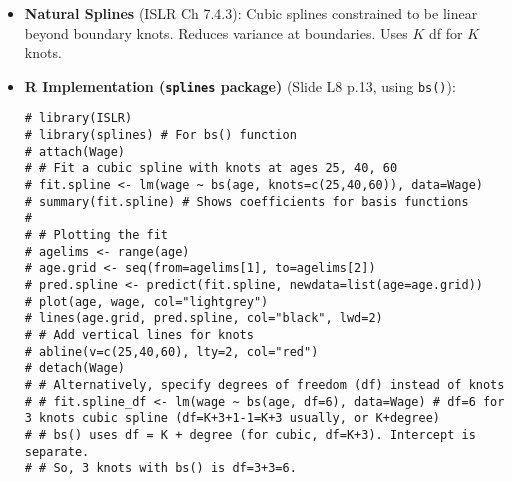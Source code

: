 \documentclass[12pt,a4paper]{article}
\newcommand{\Rpackage}[1]{\texttt{#1}} %
\newcommand{\Rfunction}[1]{\texttt{#1()}} %
\begin{document}
\begin{itemize}
\begin{itemize}
\begin{itemize}
                \end{itemize}
            \item \textbf{Natural Splines} (ISLR Ch 7.4.3): Cubic splines constrained to be linear beyond boundary knots. Reduces variance at boundaries. Uses $K$ df for $K$ knots.
            \item \textbf{R Implementation (\Rpackage{splines} package)} (Slide L8 p.13, using \Rfunction{bs}):
\begin{lstlisting}[caption={Regression Spline with Wage Data (Slide L8 p.13)}]
# library(ISLR)
# library(splines) # For bs() function
# attach(Wage)
# # Fit a cubic spline with knots at ages 25, 40, 60
# fit.spline <- lm(wage ~ bs(age, knots=c(25,40,60)), data=Wage)
# summary(fit.spline) # Shows coefficients for basis functions
# 
# # Plotting the fit
# agelims <- range(age)
# age.grid <- seq(from=agelims[1], to=agelims[2])
# pred.spline <- predict(fit.spline, newdata=list(age=age.grid))
# plot(age, wage, col="lightgrey")
# lines(age.grid, pred.spline, col="black", lwd=2)
# # Add vertical lines for knots
# abline(v=c(25,40,60), lty=2, col="red")
# detach(Wage)
# # Alternatively, specify degrees of freedom (df) instead of knots
# # fit.spline_df <- lm(wage ~ bs(age, df=6), data=Wage) # df=6 for 3 knots cubic spline (df=K+3+1-1=K+3 usually, or K+degree)
# # bs() uses df = K + degree (for cubic, df=K+3). Intercept is separate.
# # So, 3 knots with bs() is df=3+3=6.
\end{lstlisting}
        \end{itemize}


\end{itemize}
\end{document}
